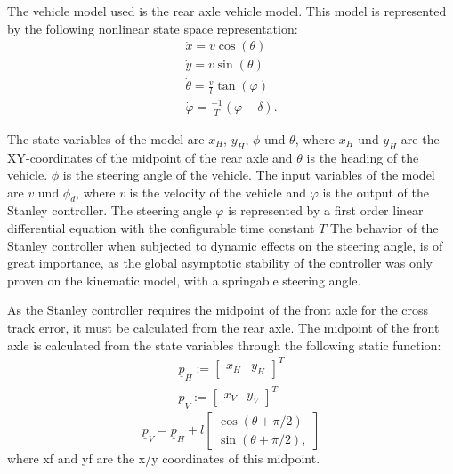 \documentclass[arbeit=studie,oneside,BCOR=12mm]{ArbeitRST}
\begin{document}
The vehicle model used is the rear axle vehicle model. This model is
represented by the following nonlinear state space representation: 
\begin{gather}
  \dot{x} = v \cos(\theta) \\
  \dot{y} = v \sin(\theta) \\
  \dot{\theta} = \frac{v}{l}\tan(\varphi) \\
  \dot{\varphi} = \frac{-1}{T}\left(\varphi - \delta\right).
\end{gather}

The state variables of the model are $x_H$, $y_H$, $\phi$ und $\theta$, where
$x_H$ und $y_H$ are the XY-coordinates of the midpoint of the rear axle and
$\theta$ is the heading of the vehicle. $\phi$ is the steering angle of the
vehicle. The input variables of the model are $v$ und $\phi_d$, where $v$ is
the velocity of the vehicle and $\varphi$ is the output of the Stanley
controller. The steering angle $\varphi$ is represented by a first order linear
differential equation with the configurable time constant $T$  The behavior of
the Stanley controller when subjected to dynamic effects on the steering angle,
is of great importance, as the global asymptotic stability of the controller
was only proven on the kinematic model, with a springable steering angle. 

As the Stanley controller requires the midpoint of the front axle for the cross
track error, it must be calculated from the rear axle. The midpoint of the
front axle is calculated from the state variables through the following static
function:
\begin{gather}
  \underline{p}_H := 
  \begin{bmatrix}
    x_H & y_H
  \end{bmatrix}^T \\
  \underline{p}_V := 
  \begin{bmatrix}
    x_V & y_V
  \end{bmatrix}^T
  \label{eq:Rear Axle and Front Axle}
\end{gather}
\begin{equation}
  \underline{p}_V = \underline{p}_H + l 
  \begin{bmatrix}
    \cos(\theta + \pi/2) \\ 
    \sin(\theta + \pi/2),
  \end{bmatrix}
  \label{eq:Transformation from Rear Axle to Front Axle}
\end{equation}
where xf and yf are the x/y coordinates of this midpoint. 
\end{document}
